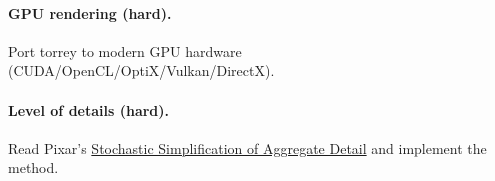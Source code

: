 \paragraph{GPU rendering (hard).}
Port torrey to modern GPU hardware (CUDA/OpenCL/OptiX/Vulkan/DirectX).

\paragraph{Level of details (hard).}
Read Pixar's \href{https://graphics.pixar.com/library/StochasticSimplification/paper.pdf}{Stochastic Simplification of Aggregate Detail} and implement the method.

% 
% 


